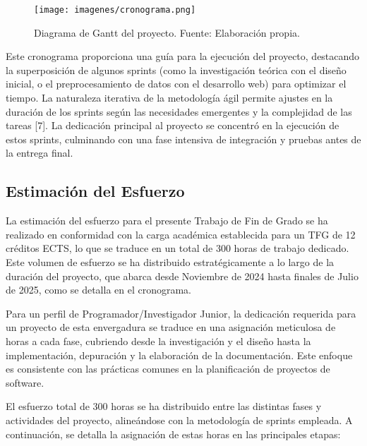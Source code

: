 \begin{figure}[ht!]
  \centering
  \texttt{[image: imagenes/cronograma.png]}
  \caption{Diagrama de Gantt del proyecto. Fuente: Elaboración propia.}
  \label{Fig.Cronograma}
\end{figure}


Este cronograma proporciona una guía para la ejecución del proyecto, destacando la superposición de algunos sprints (como la investigación teórica con el diseño inicial, o el preprocesamiento de datos con el desarrollo web) para optimizar el tiempo. La naturaleza iterativa de la metodología ágil permite ajustes en la duración de los sprints según las necesidades emergentes y la complejidad de las tareas [7]. La dedicación principal al proyecto se concentró en la ejecución de estos sprints, culminando con una fase intensiva de integración y pruebas antes de la entrega final.

\subsection{Estimación del Esfuerzo}

La estimación del esfuerzo para el presente Trabajo de Fin de Grado se ha realizado en conformidad con la carga académica establecida para un TFG de 12 créditos ECTS, lo que se traduce en un total de 300 horas de trabajo dedicado. Este volumen de esfuerzo se ha distribuido estratégicamente a lo largo de la duración del proyecto, que abarca desde Noviembre de 2024 hasta finales de Julio de 2025, como se detalla en el cronograma.

Para un perfil de Programador/Investigador Junior, la dedicación requerida para un proyecto de esta envergadura se traduce en una asignación meticulosa de horas a cada fase, cubriendo desde la investigación y el diseño hasta la implementación, depuración y la elaboración de la documentación. Este enfoque es consistente con las prácticas comunes en la planificación de proyectos de software.

El esfuerzo total de 300 horas se ha distribuido entre las distintas fases y actividades del proyecto, alineándose con la metodología de sprints empleada. A continuación, se detalla la asignación de estas horas en las principales etapas:


